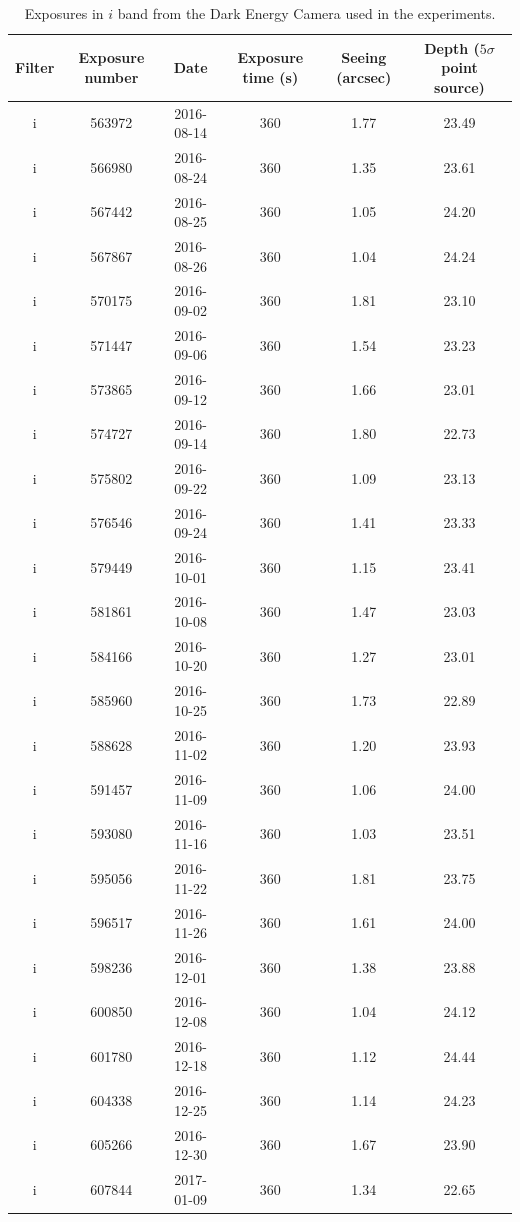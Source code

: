 \documentclass[11pt,letterpaper,linenumbers]{aastex63}
\begin{document}
\begin{table}
  \begin{center}
    \begin{scriptsize}
    \begin{tabular}{cccccc}
      \hline
      Filter & Exposure number & Date & Exposure time (s) &
      Seeing (arcsec) & Depth ($5 \sigma$ point source) \\
      \hline
      i & 563972 & 2016-08-14 & 360 & 1.77 & 23.49 \\
      i & 566980 & 2016-08-24 & 360 & 1.35 & 23.61 \\
      i & 567442 & 2016-08-25 & 360 & 1.05 & 24.20 \\
      i & 567867 & 2016-08-26 & 360 & 1.04 & 24.24 \\
      i & 570175 & 2016-09-02 & 360 & 1.81 & 23.10 \\
      i & 571447 & 2016-09-06 & 360 & 1.54 & 23.23 \\
      i & 573865 & 2016-09-12 & 360 & 1.66 & 23.01 \\
      i & 574727 & 2016-09-14 & 360 & 1.80 & 22.73 \\
      i & 575802 & 2016-09-22 & 360 & 1.09 & 23.13 \\
      i & 576546 & 2016-09-24 & 360 & 1.41 & 23.33 \\
      i & 579449 & 2016-10-01 & 360 & 1.15 & 23.41 \\
      i & 581861 & 2016-10-08 & 360 & 1.47 & 23.03 \\
      i & 584166 & 2016-10-20 & 360 & 1.27 & 23.01 \\
      i & 585960 & 2016-10-25 & 360 & 1.73 & 22.89 \\
      i & 588628 & 2016-11-02 & 360 & 1.20 & 23.93 \\
      i & 591457 & 2016-11-09 & 360 & 1.06 & 24.00 \\
      i & 593080 & 2016-11-16 & 360 & 1.03 & 23.51 \\
      i & 595056 & 2016-11-22 & 360 & 1.81 & 23.75 \\
      i & 596517 & 2016-11-26 & 360 & 1.61 & 24.00 \\
      i & 598236 & 2016-12-01 & 360 & 1.38 & 23.88 \\
      i & 600850 & 2016-12-08 & 360 & 1.04 & 24.12 \\
      i & 601780 & 2016-12-18 & 360 & 1.12 & 24.44 \\
      i & 604338 & 2016-12-25 & 360 & 1.14 & 24.23 \\
      i & 605266 & 2016-12-30 & 360 & 1.67 & 23.90 \\
      i & 607844 & 2017-01-09 & 360 & 1.34 & 22.65 \\
      \hline
    \end{tabular}
    \caption{Exposures in $i$ band from the Dark Energy Camera used in
      the experiments.\label{tab:exposuresi}}
    \end{scriptsize}
  \end{center}
\end{table}
\end{document}
